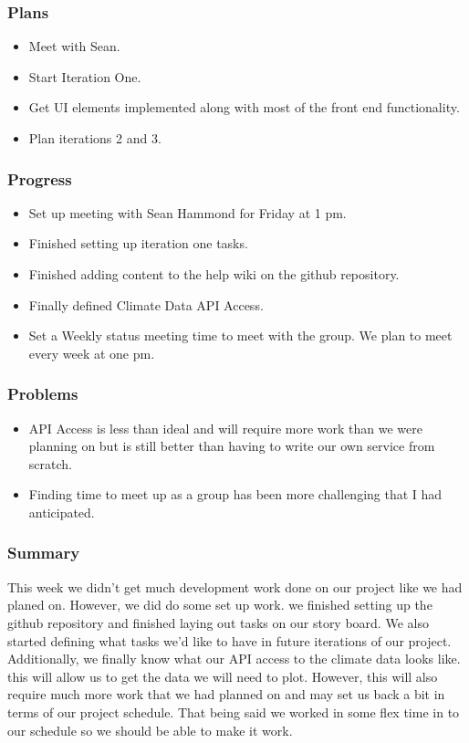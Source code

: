 \documentclass[onecolumn, draftclsnofoot,10pt, compsoc]{article}
\begin{document}
			\subsubsection{Plans}
				\begin{itemize}
					\item Meet with Sean.
					\item Start Iteration One.
					\item Get UI elements implemented along with most of the front end functionality.
					\item Plan iterations 2 and 3.
				\end{itemize}
			\subsubsection{Progress}
				\begin{itemize}
					\item Set up meeting with Sean Hammond for Friday at 1 pm.
					\item Finished setting up iteration one tasks.
					\item Finished adding content to the help wiki on the github repository.
					\item Finally defined Climate Data API Access.
					\item Set a Weekly status meeting time to meet with the group. We plan to meet every week at one pm.
				\end{itemize}
			\subsubsection{Problems}
				\begin{itemize}
					\item API Access is less than ideal and will require more work than we were planning on but is still better than having to write our own service from scratch.
					\item Finding time to meet up as a group has been more challenging that I had anticipated.
				\end{itemize}

			\subsubsection{Summary}
			This week we didn't get much development work done on our project like we had planed on. However, we did do some set up work. we finished setting up the github repository and finished laying out tasks on our story board. We also started defining what tasks we'd like to have in future iterations of our project. Additionally, we finally know what our API access to the climate data looks like. this will allow us to get the data we will need to plot. However, this will also require much more work that we had planned on and may set us back a bit in terms of our project schedule. That being said we worked in some flex time in to our schedule so we should be able to make it work.\\
\end{document}
